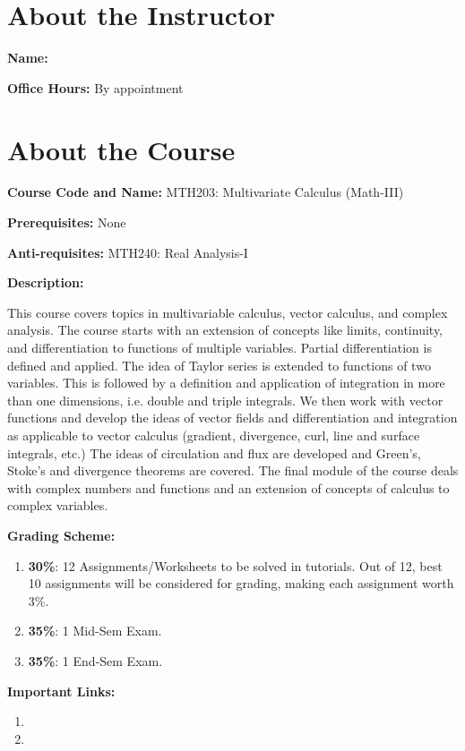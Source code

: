 \section*{About the Instructor}
\textbf{Name:} 

\textbf{Office Hours:} By appointment

\section*{About the Course}
\textbf{Course Code and Name:} MTH203: Multivariate Calculus (Math-III)

\textbf{Prerequisites:} None

\textbf{Anti-requisites:} MTH240: Real Analysis-I

\textbf{Description:}

This course covers topics in multivariable calculus, vector calculus, and complex analysis. The course starts with an
extension of concepts like limits, continuity, and differentiation to functions of multiple variables. Partial
differentiation is defined and applied. The idea of Taylor series is extended to functions of two variables. This is
followed by a definition and application of integration in more than one dimensions, i.e. double and triple integrals. We
then work with vector functions and develop the ideas of vector fields and differentiation and integration as applicable to
vector calculus (gradient, divergence, curl, line and surface integrals, etc.) The ideas of circulation and flux are
developed and Green's, Stoke's and divergence theorems are covered. The final module of the course deals with complex
numbers and functions and an extension of concepts of calculus to complex variables.

\textbf{Grading Scheme:}
\begin{enumerate}
    \item \textbf{30\%}: 12 Assignments/Worksheets to be solved in tutorials. Out of 12, best 10 assignments will be
    considered for grading, making each assignment worth 3\%.

    \item \textbf{35\%}: 1 Mid-Sem Exam.
    \item \textbf{35\%}: 1 End-Sem Exam.
\end{enumerate}

\textbf{Important Links:}
\begin{enumerate}
    \item {}
    \item {}
\end{enumerate}

\pagebreak